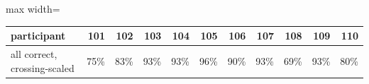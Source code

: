 \begin{adjustbox}{max width=\textwidth}
{\footnotesize
\begin{tabular}{lrrrrrrrrrr}
\toprule
\textbf{participant} & \textbf{101} & \textbf{102} & \textbf{103} & \textbf{104} & \textbf{105} & \textbf{106} & \textbf{107} & \textbf{108} & \textbf{109} & \textbf{110} \\
\midrule
all correct, crossing-scaled & 75\% & 83\% & 93\% & 93\% & 96\% & 90\% & 93\% & 69\% & 93\% & 80\% \\
\bottomrule
\end{tabular}
}
\end{adjustbox}

